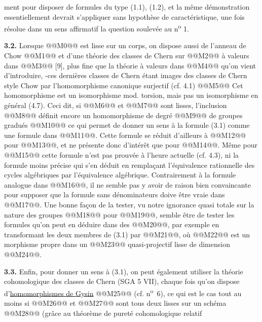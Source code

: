 
ment pour disposer de formules du type (1.1), (1.2), et la même démonstration essentiellement devrait s'appliquer sans hypothèse de caractéristique, une fois résolue dans un sens affirmatif la question soulevée au n\textsuperscript{o} 1.

\textbf{3.2.} Lorsque @@M0@@ est lisse sur un corps, on dispose aussi de l'anneau de Chow
@@M1@@
et d'une théorie des classes de Chern sur @@M2@@ à valeurs dans @@M3@@ [9], plus fine que la théorie à valeurs dans @@M4@@ qu'on vient d'introduire, -ces dernières classes de Chern étant images des classes de Chern style Chow par l'homomorphisme canonique surjectif (cf. 4.1)
@@M5@@
Cet homomorphisme est un isomorphisme mod. torsion, mais pas un isomorphisme en général (4.7). Ceci dit, si @@M6@@ et @@M7@@ sont lisses, l'inclusion @@M8@@ définit encore un homomorphisme de degré @@M9@@ de groupes gradués
@@M10@@
ce qui permet de donner un sens à la formule (3.1) comme une formule dans @@M11@@. Cette formule se réduit d'ailleurs à @@M12@@ pour @@M13@@, et ne présente donc d'intérêt que pour @@M14@@. Même pour @@M15@@ cette formule n'est pas prouvée à l'heure actuelle (cf. 4.3), ni la formule moins précise qui s'en déduit en remplaçant l'équivalence rationnelle des cycles algébriques par l'équivalence algébrique. Contrairement à la formule analogue dans @@M16@@, il ne semble pas y avoir de raison bien convaincante pour supposer que la formule sans dénominateurs doive être vraie dans @@M17@@. Une bonne façon de la tester, vu notre ignorance quasi totale sur la nature des groupes @@M18@@ pour @@M19@@, semble être de tester les formules qu'on peut en déduire dans des @@M20@@, par exemple en transformant les deux membres de (3.1) par @@M21@@, où @@M22@@ est un morphisme propre dans un @@M23@@ quasi-projectif lisse de dimension @@M24@@.

\textbf{3.3.} Enfin, pour donner un sens à (3.1), on peut également utiliser la théorie cohomologique des classes de Chern (SGA 5 VII), chaque fois qu'on dispose d'\uline{homomorphismes de Gysin}
@@M25@@
(cf. n\textsuperscript{o}~6), ce qui est le cas tout au moins si @@M26@@ et @@M27@@ sont tous deux lisses sur un schéma @@M28@@ (grâce au théorème de pureté cohomologique relatif 
